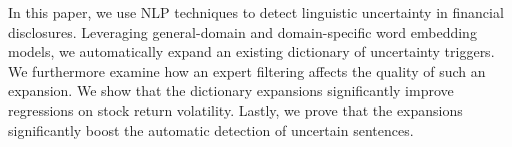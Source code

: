In this paper, we use NLP techniques to detect linguistic uncertainty in financial disclosures. Leveraging general-domain and domain-specific word embedding models, we automatically expand an existing dictionary of uncertainty triggers. We furthermore examine how an expert filtering affects the quality of such an expansion. We show that the dictionary expansions significantly improve regressions on stock return volatility. Lastly, we prove that the expansions significantly boost the automatic detection of uncertain sentences.
